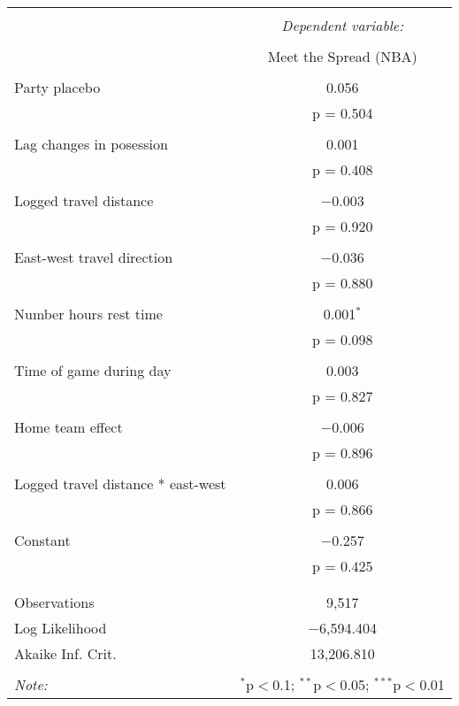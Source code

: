 \documentclass[letterpaper,12pt]{article}
\begin{document}
\begin{tabular}{@{\extracolsep{5pt}}lc}  \\[-1.8ex]\hline  \hline \\[-1.8ex]   & \multicolumn{1}{c}{\textit{Dependent variable:}} \\  \cline{2-2}  \\[-1.8ex] & Meet the Spread (NBA) \\  \hline \\[-1.8ex]   Party placebo & 0.056 \\    & p = 0.504 \\    & \\   Lag changes in posession & 0.001 \\    & p = 0.408 \\    & \\   Logged travel distance & $-$0.003 \\    & p = 0.920 \\    & \\   East-west travel direction & $-$0.036 \\    & p = 0.880 \\    & \\   Number hours rest time & 0.001$^{*}$ \\    & p = 0.098 \\    & \\   Time of game during day & 0.003 \\    & p = 0.827 \\    & \\   Home team effect & $-$0.006 \\    & p = 0.896 \\    & \\   Logged travel distance * east-west & 0.006 \\    & p = 0.866 \\    & \\   Constant & $-$0.257 \\    & p = 0.425 \\    & \\  \hline \\[-1.8ex]  Observations & 9,517 \\  Log Likelihood & $-$6,594.404 \\  Akaike Inf. Crit. & 13,206.810 \\  \hline  \hline \\[-1.8ex]  \textit{Note:}  & \multicolumn{1}{r}{$^{*}$p$<$0.1; $^{**}$p$<$0.05; $^{***}$p$<$0.01} \\  \end{tabular}  
\end{document}
